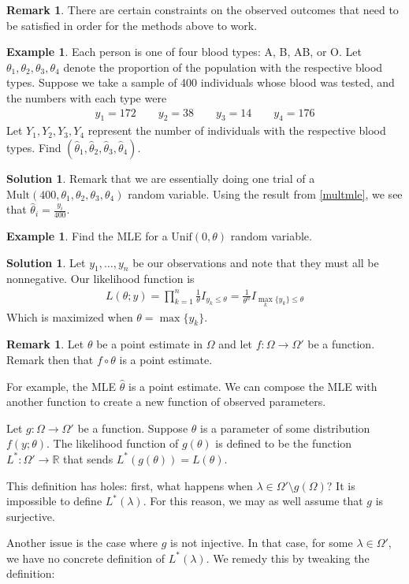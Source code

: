 \documentclass[11pt]{amsart}
\theoremstyle{definition}
\newtheorem{remark}[theorem]{Remark}
\newtheorem{example}[theorem]{Example}
\newtheorem{solution}[theorem]{Solution}
\numberwithin{equation}{section}
\begin{document}
\begin{remark}
    There are certain constraints on the observed outcomes that need to be satisfied in order for the methods above to work.
\end{remark}
\begin{example}
    Each person is one of four blood types: A, B, AB, or O. Let $\theta_1,\theta_2,\theta_3,\theta_4$ denote the proportion of the population with the respective blood types. Suppose we take a sample of 400 individuals whose blood was tested, and the numbers with each type were 
    \begin{align*}
        y_1=172\qquad y_2=38\qquad y_3=14\qquad y_4=176
    \end{align*}
    Let $Y_1,Y_2,Y_3,Y_4$ represent the number of individuals with the respective blood types. Find $(\hat\theta_1,\hat\theta_2,\hat\theta_3,\hat\theta_4)$.
\end{example}
\addtocounter{theorem}{-1}
\begin{solution}
    Remark that we are essentially doing one trial of a $\mathrm{Mult}(400,\theta_1,\theta_2,\theta_3,\theta_4)$ random variable. Using the result from \ref{multmle}, we see that $\hat\theta_i=\frac{y_i}{400}$. 
\end{solution}
\begin{example}
    Find the MLE for a $\mathrm{Unif}(0,\theta)$ random variable.
\end{example}
\addtocounter{theorem}{-1}
\begin{solution}
    Let $y_1,\ldots,y_n$ be our observations and note that they must all be nonnegative. Our likelihood function is
    \begin{align*}
        L(\theta;y)=\prod_{k=1}^n\frac{1}{\theta}I_{y_k\le\theta}=\frac{1}{\theta^n}I_{\max_k\{y_k\}\le\theta}
    \end{align*}
    Which is maximized when $\theta=\max\{y_k\}$.
\end{solution}
\begin{remark}
    Let $\theta$ be a point estimate in $\Omega$ and let $f:\Omega\to\Omega'$ be a function. Remark then that $f\circ\theta$ is a point estimate. 

    For example, the MLE $\hat\theta$ is a point estimate. We can compose the MLE with another function to create a new function of observed parameters.

    Let $g:\Omega\to\Omega'$ be a function. Suppose $\theta$ is a parameter of some distribution $f(y;\theta)$. The likelihood function of $g(\theta)$ is defined to be the function $L^*:\Omega'\to\mathbb R$ that sends $L^*(g(\theta))=L(\theta)$.

    This definition has holes: first, what happens when $\lambda\in\Omega'\setminus g(\Omega)$? It is impossible to define $L^*(\lambda)$. For this reason, we may as well assume that $g$ is surjective.

    Another issue is the case where $g$ is not injective. In that case, for some $\lambda\in\Omega'$, we have no concrete definition of $L^*(\lambda)$. We remedy this by tweaking the definition:
\end{remark}
\end{document}
